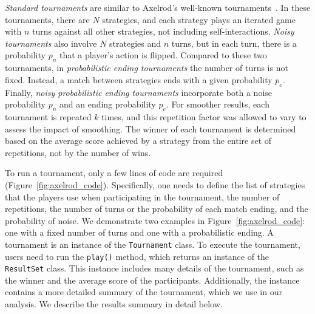 \documentclass{article}
\begin{document}
{\it Standard tournaments} are similar to Axelrod's well-known
tournaments~\cite{Axelrod1980a}. In these tournaments, there are \(N\)
strategies, and each strategy plays an iterated game with \(n\) turns against
all other strategies, not including self-interactions.
{\it Noisy tournaments} also involve \(N\) strategies and \(n\) turns, but
in each turn, there is a probability \(p_n\) that a player's action is
flipped. Compared to these two tournaments, in 
{\it probabilistic ending tournaments} the number of turns is not fixed. Instead,
a match between strategies ends with a given probability
\(p_e\).
Finally, {\it noisy probabilistic ending tournaments} incorporate both a
noise probability \(p_n\) and an ending probability \(p_e\). For smoother
results, each tournament is repeated \(k\) times, and this repetition factor was
allowed to vary to assess the impact of smoothing. The winner of each tournament
is determined based on the average score achieved by a strategy from the entire
set of repetitions, not by the number of wins.


To run a tournament, only a few lines of code are required
(Figure~\ref{fig:axelrod_code}). Specifically, one needs to define the list of
strategies that the players use when participating in the tournament, the number
of repetitions, the number of turns or the probability of each match ending, and
the probability of noise. We demonstrate two examples in
Figure~\ref{fig:axelrod_code}: one with a fixed number of turns and one with a
probabilistic ending. A tournament is an instance of the \texttt{Tournament}
class. To execute the tournament, users need to run the \texttt{play()}
method, which returns an instance of the \texttt{ResultSet} class. This
instance includes many details of the tournament, such as the winner and the
average score of the participants. Additionally, the instance contains a more
detailed summary of the tournament, which we use in our analysis. We describe
the results summary in detail below.
\end{document}
